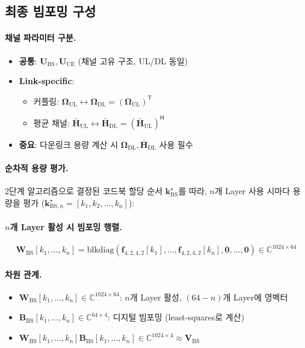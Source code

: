 \documentclass[10pt]{article}
\begin{document}
\subsection{최종 빔포밍 구성}

\paragraph{채널 파라미터 구분.}
\begin{itemize}
    \item \textbf{공통}: $\mathbf{U}_{\text{BS}}, \mathbf{U}_{\text{UE}}$ (채널 고유 구조, UL/DL 동일)
    \item \textbf{Link-specific}: 
    \begin{itemize}
        \item 커플링: $\boldsymbol{\Omega}_{\text{UL}} \leftrightarrow \boldsymbol{\Omega}_{\text{DL}} = (\boldsymbol{\Omega}_{\text{UL}})^{\mathsf{T}}$
        \item 평균 채널: $\bar{\mathbf{H}}_{\text{UL}} \leftrightarrow \bar{\mathbf{H}}_{\text{DL}} = (\bar{\mathbf{H}}_{\text{UL}})^{\mathsf{H}}$
    \end{itemize}
    \item \textbf{중요}: 다운링크 용량 계산 시 $\boldsymbol{\Omega}_{\text{DL}}, \bar{\mathbf{H}}_{\text{DL}}$ 사용 필수
\end{itemize}

\paragraph{순차적 용량 평가.}
2단계 알고리즘으로 결정된 코드북 할당 순서 $\boldsymbol{k}_{\text{BS}}^{\star}$를 따라, $n$개 Layer 사용 시마다 용량을 평가 ($\boldsymbol{k}_{\text{BS},n}^{\star} = [k_1, k_2, \ldots, k_n]$):

\paragraph{$n$개 Layer 활성 시 빔포밍 행렬.}
\begin{equation}
\mathbf{W}_{\text{BS}}[k_1, \ldots, k_n] = \text{blkdiag}(\mathbf{f}_{4,2,4,2}[k_1], \ldots, \mathbf{f}_{4,2,4,2}[k_n], \mathbf{0}, \ldots, \mathbf{0}) \in \mathbb{C}^{1024 \times 64}
\end{equation}

\paragraph{차원 관계.}
\begin{itemize}
    \item $\mathbf{W}_{\text{BS}}[k_1, \ldots, k_n] \in \mathbb{C}^{1024 \times 64}$: $n$개 Layer 활성, $(64-n)$개 Layer에 영벡터
    \item $\mathbf{B}_{\text{BS}}[k_1, \ldots, k_n] \in \mathbb{C}^{64 \times 4}$: 디지털 빔포밍 (least-squares로 계산)
    \item $\mathbf{W}_{\text{BS}}[k_1, \ldots, k_n] \mathbf{B}_{\text{BS}}[k_1, \ldots, k_n] \in \mathbb{C}^{1024 \times 4} \approx \mathbf{V}_{\text{BS}}$
\end{itemize}
\end{document}

